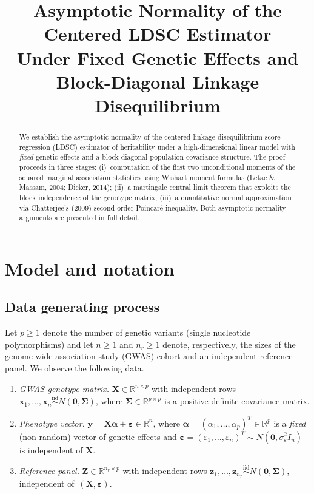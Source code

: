 \documentclass[11pt]{article}
\title{\textbf{Asymptotic Normality of the Centered LDSC Estimator}\\[6pt]
\large Under Fixed Genetic Effects and Block-Diagonal Linkage Disequilibrium}
\author{}
\date{}
\newcommand{\R}{\mathbb{R}}
\newcommand{\X}{\bm{X}}
\newcommand{\Z}{\bm{Z}}
\newcommand{\y}{\bm{y}}
\newcommand{\bSig}{\bm{\Sigma}}
\newcommand{\bal}{\bm{\alpha}}
\newcommand{\beps}{\bm{\varepsilon}}
\newcommand{\bx}{\bm{x}}
\newcommand{\bz}{\bm{z}}
\begin{document}
\maketitle

\begin{abstract}
We establish the asymptotic normality of the centered linkage disequilibrium
score regression (LDSC) estimator of heritability under a high-dimensional
linear model with \emph{fixed} genetic effects and a block-diagonal population
covariance structure.  The proof proceeds in three stages: (i)~computation of
the first two unconditional moments of the squared marginal association
statistics using Wishart moment formulas (Letac \& Massam, 2004;
Dicker, 2014); (ii)~a martingale central limit theorem that exploits the block
independence of the genotype matrix; (iii)~a quantitative normal
approximation via Chatterjee's (2009) second-order Poincar\'e inequality.
Both asymptotic normality arguments are presented in full detail.
\end{abstract}

\tableofcontents

\section{Model and notation}\label{sec:setup}

\subsection{Data generating process}\label{ssec:dgp}

Let $p\ge1$ denote the number of genetic variants (single nucleotide
polymorphisms) and let $n\ge1$ and $n_r\ge1$ denote, respectively, the sizes of
the genome-wide association study (GWAS) cohort and an independent reference
panel.  We observe the following data.
\begin{enumerate}[label=(\roman*)]
\item \emph{GWAS genotype matrix.}\; $\X\in\R^{n\times p}$ with independent
  rows $\bx_1,\dots,\bx_n\overset{\mathrm{iid}}{\sim}N(\bm{0},\bSig)$, where
  $\bSig\in\R^{p\times p}$ is a positive-definite covariance matrix.

\item \emph{Phenotype vector.}\; $\y=\X\bal+\beps\in\R^{n}$, where
  $\bal=(\alpha_1,\dots,\alpha_p)^{T}\in\R^p$ is a \emph{fixed}
  (non-random) vector of genetic effects and
  $\beps=(\varepsilon_1,\dots,\varepsilon_n)^{T}\sim N(\bm{0},\sigma_\varepsilon^2 I_n)$
  is independent of $\X$.

\item \emph{Reference panel.}\; $\Z\in\R^{n_r\times p}$ with independent rows
  $\bz_1,\dots,\bz_{n_r}\overset{\mathrm{iid}}{\sim}N(\bm{0},\bSig)$,
  independent of~$(\X,\beps)$.
\end{enumerate}
\end{document}
